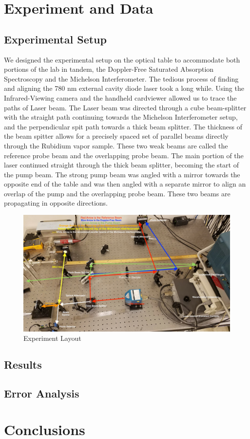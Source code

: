 \documentclass[12pt]{article}
\begin{document}
\section*{Experiment and Data}

\subsection*{Experimental Setup}
We designed the experimental setup on the optical table to accommodate both portions of the lab in tandem, the Doppler-Free Saturated Absorption Spectroscopy and the Michelson Interferometer. The tedious process of finding and aligning the 780 nm external cavity diode laser took a long while. Using the Infrared-Viewing camera and the handheld cardviewer allowed us to trace the paths of Laser beam. The Laser beam was directed through a cube beam-splitter with the straight path continuing towards the Michelson Interferometer setup, and the perpendicular spit path towards a thick beam splitter. The thickness of the beam spitter allows for a precisely spaced set of parallel beams directly through the Rubidium vapor sample. These two weak beams are called the reference probe beam and the overlapping probe beam. The main portion of the laser continued straight through the thick beam splitter, becoming the start of the pump beam. The strong pump beam was angled with a mirror towards the opposite end of the table and was then angled with a separate mirror to align an overlap of the pump and the overlapping probe beam. These two beams are propagating in opposite directions. 

\begin{figure}%
	\centering
	\includegraphics[width=\textwidth]{DFS_Layout.jpg}
	\caption{Experiment Layout}%
	\label{fig:Layout}%
\end{figure}

\subsection*{Results}

\subsection*{Error Analysis}

\section*{Conclusions}





\end{document}

